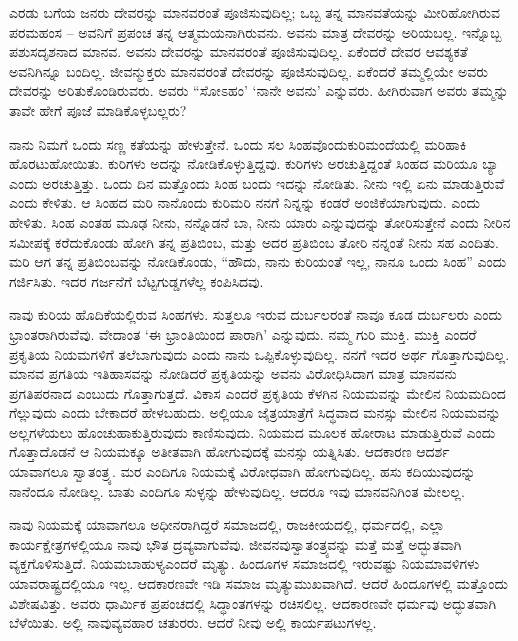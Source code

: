 ಎರಡು ಬಗೆಯ ಜನರು ದೇವರನ್ನು ಮಾನವರಂತೆ ಪೂಜಿಸುವುದಿಲ್ಲ; ಒಬ್ಬ ತನ್ನ ಮಾನವತೆಯನ್ನು ಮೀರಿಹೋಗಿರುವ ಪರಮಹಂಸ – ಅವನಿಗೆ ಪ್ರಪಂಚ ತನ್ನ ಆತ್ಮಮಯನಾಗಿರುವನು. ಅವನು ಮಾತ್ರ ದೇವರನ್ನು ಅರಿಯಬಲ್ಲ. ಇನ್ನೊಬ್ಬ ಪಶುಸದೃಶನಾದ ಮಾನವ. ಅವನು ದೇವರನ್ನು ಮಾನವರಂತೆ ಪೂಜಿಸುವುದಿಲ್ಲ. ಏಕೆಂದರೆ ದೇವರ ಆವಶ್ಯಕತೆ ಅವನಿಗಿನ್ನೂ ಬಂದಿಲ್ಲ. ಜೀವನ್ಮುಕ್ತರು ಮಾನವರಂತೆ ದೇವರನ್ನು ಪೂಜಿಸುವುದಿಲ್ಲ. ಏಕೆಂದರೆ ತಮ್ಮಲ್ಲಿಯೇ ಅವರು ದೇವರನ್ನು ಅರಿತುಕೊಂಡಿರುವರು. ಅವರು “ಸೋಽಹಂ’ ‘ನಾನೇ ಅವನು’ ಎನ್ನುವರು. ಹೀಗಿರುವಾಗ ಅವರು ತಮ್ಮನ್ನು ತಾವೇ ಹೇಗೆ ಪೂಜೆ ಮಾಡಿಕೊಳ್ಳಬಲ್ಲರು?

ನಾನು ನಿಮಗೆ ಒಂದು ಸಣ್ಣ ಕತೆಯನ್ನು ಹೇಳುತ್ತೇನೆ. ಒಂದು ಸಲ ಸಿಂಹವೊಂದು\break ಕುರಿಮಂದೆಯಲ್ಲಿ ಮರಿಹಾಕಿ ಹೊರಟುಹೋಯಿತು. ಕುರಿಗಳು ಅದನ್ನು ನೋಡಿಕೊಳ್ಳುತ್ತಿದ್ದವು. ಕುರಿಗಳು ಅರಚುತ್ತಿದ್ದಂತೆ ಸಿಂಹದ ಮರಿಯೂ ಬ್ಯಾ ಎಂದು ಅರಚುತ್ತಿತ್ತು. ಒಂದು ದಿನ ಮತ್ತೊಂದು ಸಿಂಹ ಬಂದು ಇದನ್ನು ನೋಡಿತು. ನೀನು ಇಲ್ಲಿ ಏನು ಮಾಡುತ್ತಿರುವೆ ಎಂದು ಕೇಳಿತು. ಆ ಸಿಂಹದ ಮರಿ ನಾನೊಂದು ಕುರಿಮರಿ ನನಗೆ ನಿನ್ನನ್ನು ಕಂಡರೆ ಅಂಜಿಕೆಯಾಗುವುದು. ಎಂದು ಹೇಳಿತು. ಸಿಂಹ ಎಂತಹ ಮೂಢ ನೀನು, ನನ್ನೊಡನೆ ಬಾ, ನೀನು ಯಾರು ಎನ್ನುವುದನ್ನು ತೋರಿಸುತ್ತೇನೆ ಎಂದು ನೀರಿನ ಸಮೀಪಕ್ಕೆ ಕರೆದುಕೊಂಡು ಹೋಗಿ ತನ್ನ ಪ್ರತಿಬಿಂಬ, ಮತ್ತು ಅದರ ಪ್ರತಿಬಿಂಬ ತೋರಿ ನನ್ನಂತೆ ನೀನು ಸಹ ಎಂದಿತು. ಮರಿ ಆಗ ತನ್ನ ಪ್ರತಿಬಿಂಬವನ್ನು ನೋಡಿಕೊಂಡು, “ಹೌದು, ನಾನು ಕುರಿಯಂತೆ ಇಲ್ಲ, ನಾನೂ ಒಂದು ಸಿಂಹ” ಎಂದು ಗರ್ಜಿಸಿತು. ಇದರ ಗರ್ಜನೆಗೆ ಬೆಟ್ಟಗುಡ್ಡಗಳೆಲ್ಲ ಕಂಪಿಸಿದವು.

ನಾವು ಕುರಿಯ ಹೊದಿಕೆಯಲ್ಲಿರುವ ಸಿಂಹಗಳು. ಸುತ್ತಲೂ ಇರುವ ದುರ್ಬಲರಂತೆ ನಾವೂ ಕೂಡ ದುರ್ಬಲರು ಎಂದು ಭ್ರಾಂತರಾಗಿರುವೆವು. ವೇದಾಂತ ‘ಈ ಭ್ರಾಂತಿಯಿಂದ ಪಾರಾಗಿ’ ಎನ್ನುವುದು. ನಮ್ಮ ಗುರಿ ಮುಕ್ತಿ. ಮುಕ್ತಿ ಎಂದರೆ ಪ್ರಕೃತಿಯ ನಿಯಮಗಳಿಗೆ ತಲೆಬಾಗುವುದು ಎಂದು ನಾನು ಒಪ್ಪಿಕೊಳ್ಳುವುದಿಲ್ಲ. ನನಗೆ ಇದರ ಅರ್ಥ ಗೊತ್ತಾಗುವುದಿಲ್ಲ. ಮಾನವ ಪ್ರಗತಿಯ ಇತಿಹಾಸವನ್ನು ನೋಡಿದರೆ ಪ್ರಕೃತಿಯನ್ನು ಅವನು ವಿರೋಧಿಸಿದಾಗ ಮಾತ್ರ ಮಾನವನು ಪ್ರಗತಿಪರನಾದ ಎಂಬುದು ಗೊತ್ತಾಗುತ್ತದೆ. ವಿಕಾಸ ಎಂದರೆ ಪ್ರಕೃತಿಯ ಕೆಳಗಿನ ನಿಯಮವನ್ನು ಮೇಲಿನ ನಿಯಮದಿಂದ ಗೆಲ್ಲುವುದು ಎಂದು ಬೇಕಾದರೆ ಹೇಳಬಹುದು. ಅಲ್ಲಿಯೂ ಜೈತ್ರಯಾತ್ರೆಗೆ ಸಿದ್ಧವಾದ ಮನಸ್ಸು ಮೇಲಿನ ನಿಯಮವನ್ನು ಅಲ್ಲಗಳೆಯಲು ಹೊಂಚುಹಾಕುತ್ತಿರುವುದು ಕಾಣಿಸುವುದು. ನಿಯಮದ ಮೂಲಕ ಹೋರಾಟ ಮಾಡುತ್ತಿರುವೆ ಎಂದು ಗೊತ್ತಾದೊಡನೆ ಆ ನಿಯಮಕ್ಕೂ ಅತೀತವಾಗಿ ಹೋಗುವುದಕ್ಕೆ ಮನಸ್ಸು ಯತ್ನಿಸಿತು. ಆದಕಾರಣ ಆದರ್ಶ ಯಾವಾಗಲೂ ಸ್ವಾತಂತ್ರ್ಯ. ಮರ ಎಂದಿಗೂ ನಿಯಮಕ್ಕೆ ವಿರೋಧವಾಗಿ ಹೋಗುವುದಿಲ್ಲ. ಹಸು ಕದಿಯುವುದನ್ನು ನಾನೆಂದೂ ನೋಡಿಲ್ಲ. ಬಾತು ಎಂದಿಗೂ ಸುಳ್ಳನ್ನು ಹೇಳುವುದಿಲ್ಲ. ಆದರೂ ಇವು ಮಾನವನಿಗಿಂತ ಮೇಲಲ್ಲ.

ನಾವು ನಿಯಮಕ್ಕೆ ಯಾವಾಗಲೂ ಅಧೀನರಾಗಿದ್ದರೆ ಸಮಾಜದಲ್ಲಿ, ರಾಜಕೀಯದಲ್ಲಿ, ಧರ್ಮದಲ್ಲಿ, ಎಲ್ಲಾ ಕಾರ್ಯಕ್ಷೇತ್ರಗಳಲ್ಲಿಯೂ ನಾವು ಭೌತ ದ್ರವ್ಯವಾಗುವೆವು. ಜೀವನವು\break ಸ್ವಾತಂತ್ರ್ಯವನ್ನು ಮತ್ತೆ ಮತ್ತೆ ಅದ್ಭುತವಾಗಿ ವ್ಯಕ್ತಗೊಳಿಸುತ್ತಿದೆ. ನಿಯಮಬಾಹುಳ್ಯ\break ಎಂದರೆ ಮೃತ್ಯು. ಹಿಂದೂಗಳ ಸಮಾಜದಲ್ಲಿ ಇರುವಷ್ಟು ನಿಯಮಾವಳಿಗಳು ಯಾವ\break ರಾಷ್ಟ್ರದಲ್ಲಿಯೂ ಇಲ್ಲ. ಆದಕಾರಣವೇ ಇಡಿ ಸಮಾಜ ಮೃತ್ಯುಮುಖವಾಗಿದೆ. ಆದರೆ ಹಿಂದೂಗಳಲ್ಲಿ ಮತ್ತೊಂದು ವಿಶೇಷವಿತ್ತು. ಅವರು ಧಾರ್ಮಿಕ ಪ್ರಪಂಚದಲ್ಲಿ ಸಿದ್ಧಾಂತಗಳನ್ನು ರಚಿಸಲಿಲ್ಲ. ಆದಕಾರಣವೇ ಧರ್ಮವು ಅದ್ಭುತವಾಗಿ ಬೆಳೆಯಿತು. ಅಲ್ಲಿ ನಾವು\break ವ್ಯವಹಾರ ಚತುರರು. ಆದರೆ ನೀವು ಅಲ್ಲಿ ಕಾರ್ಯಪಟುಗಳಲ್ಲ.

